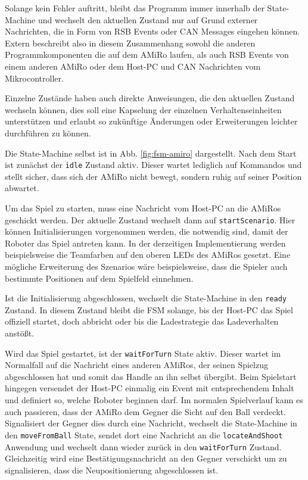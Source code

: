 Solange kein Fehler auftritt, bleibt das Programm immer innerhalb der State-Machine und wechselt den aktuellen Zustand nur auf Grund externer Nachrichten, die in Form von RSB Events oder CAN Messages eingehen können. Extern beschreibt also in diesem Zusammenhang sowohl die anderen Programmkomponenten die auf dem AMiRo laufen, als auch RSB Events von einem anderen AMiRo oder dem Host-PC und CAN Nachrichten vom Mikrocontroller.

Einzelne Zustände haben auch direkte Anweisungen, die den aktuellen Zustand wechseln können, dies soll eine Kapselung der einzelnen Verhaltenseinheiten unterstützen und erlaubt so zukünftige Änderungen oder Erweiterungen leichter durchführen zu können.

Die State-Machine selbst ist in Abb. \ref{fig:fsm-amiro} dargestellt. Nach dem Start ist zunächst der \texttt{idle} Zustand aktiv. Dieser wartet lediglich auf Kommandos und stellt sicher, dass sich der AMiRo nicht bewegt, sondern ruhig auf seiner Position abwartet.

Um das Spiel zu starten, muss eine Nachricht vom Host-PC an die AMiRos geschickt werden. Der aktuelle Zustand wechselt dann auf \texttt{startScenario}. Hier können Initialisierungen vorgenommen werden, die notwendig sind, damit der Roboter das Spiel antreten kann. In der derzeitigen Implementierung werden beispielsweise die Teamfarben auf den oberen LEDs des AMiRos gesetzt. Eine mögliche Erweiterung des Szenarios wäre beispielsweise, dass die Spieler auch bestimmte Positionen auf dem Spielfeld einnehmen.

Ist die Initialisierung abgeschlossen, wechselt die State-Machine in den \texttt{ready} Zustand. In diesem Zustand bleibt die FSM solange, bis der Host-PC das Spiel offiziell startet, doch abbricht oder bis die Ladestrategie das Ladeverhalten anstößt.

Wird das Spiel gestartet, ist der \texttt{waitForTurn} State aktiv. Dieser wartet im Normalfall auf die Nachricht eines anderen AMiRos, der seinen Spielzug abgeschlossen hat und somit das Handle an ihn selbst übergibt. Beim Spielstart hingegen versendet der Host-PC einmalig ein Event mit entsprechendem Inhalt und definiert so, welche Roboter beginnen darf. Im normalen Spielverlauf kann es auch passieren, dass der AMiRo dem Gegner die Sicht auf den Ball verdeckt. Signalisiert der Gegner dies durch eine Nachricht, wechselt die State-Machine in den \texttt{moveFromBall} State, sendet dort eine Nachricht an die \texttt{locateAndShoot} Anwendung und wechselt dann wieder zurück in den \texttt{waitForTurn} Zustand. Gleichzeitig wird eine Bestätigungsnachricht an den Gegner verschickt um zu signalisieren, dass die Neupositionierung abgeschlossen ist.

